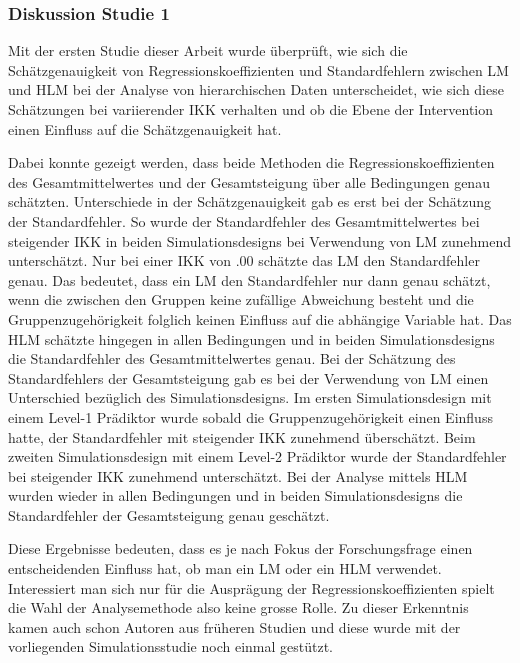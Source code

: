 \documentclass[12pt]{article}\usepackage[]{graphicx}\usepackage[]{color}
\begin{document}
\subsubsection{Diskussion Studie 1}
Mit der ersten Studie dieser Arbeit wurde überprüft, wie sich die Schätzgenauigkeit von Regressionskoeffizienten und Standardfehlern zwischen LM und HLM bei der Analyse von hierarchischen Daten unterscheidet, wie sich diese Schätzungen bei variierender IKK verhalten und ob die Ebene der Intervention einen Einfluss auf die Schätzgenauigkeit hat. 

Dabei konnte gezeigt werden, dass beide Methoden die Regressionskoeffizienten des Gesamtmittelwertes und der Gesamtsteigung über alle Bedingungen genau schätzten. Unterschiede in der Schätzgenauigkeit gab es erst bei der Schätzung der Standardfehler. So wurde der Standardfehler des Gesamtmittelwertes bei steigender IKK in beiden Simulationsdesigns bei Verwendung von LM zunehmend unterschätzt. Nur bei einer IKK von .00 schätzte das LM den Standardfehler genau. Das bedeutet, dass ein LM den Standardfehler nur dann genau schätzt, wenn die zwischen den Gruppen keine zufällige Abweichung besteht und die Gruppenzugehörigkeit folglich keinen Einfluss auf die abhängige Variable hat. Das HLM schätzte hingegen in allen Bedingungen und in beiden Simulationsdesigns die Standardfehler des Gesamtmittelwertes genau. Bei der Schätzung des Standardfehlers der Gesamtsteigung gab es bei der Verwendung von LM einen Unterschied bezüglich des Simulationsdesigns. Im ersten Simulationsdesign mit einem Level-1 Prädiktor wurde sobald die Gruppenzugehörigkeit einen Einfluss hatte, der Standardfehler mit steigender IKK zunehmend überschätzt. Beim zweiten Simulationsdesign mit einem Level-2 Prädiktor wurde der Standardfehler bei steigender IKK zunehmend unterschätzt. Bei der Analyse mittels HLM wurden wieder in allen Bedingungen und in beiden Simulationsdesigns die Standardfehler der Gesamtsteigung genau geschätzt.

Diese Ergebnisse bedeuten, dass es je nach Fokus der Forschungsfrage einen entscheidenden Einfluss hat, ob man ein LM oder ein HLM verwendet. Interessiert man sich nur für die Ausprägung der Regressionskoeffizienten spielt die Wahl der Analysemethode also keine grosse Rolle. Zu dieser Erkenntnis kamen auch schon Autoren aus früheren Studien \citep{mcneish2014analyzing, mundfrom2002monte, osborne2000advantages} und diese wurde mit der vorliegenden Simulationsstudie noch einmal gestützt. 
\end{document}
